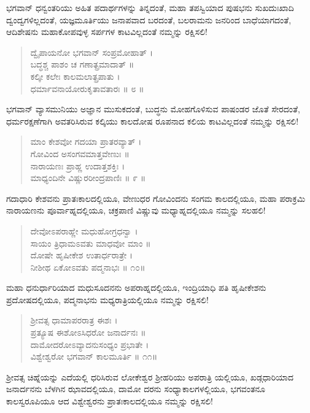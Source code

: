 ಭಗವಾನ್ ಧನ್ವಂತರಿಯು ಅಹಿತ ಪದಾರ್ಥಗಳನ್ನು ತಿನ್ನದಂತೆ, ಮಹಾ ತಪಸ್ವಿಯಾದ ಪುಷಭನು ಸುಖದುಃಖಾದಿ ದ್ವಂದ್ವಗಳಿಲ್ಲದಂತೆ, ಯಜ್ಞಮೂರ್ತಿಯು ಜನಾಪವಾದ ಬರದಂತೆ, ಬಲರಾಮನು ಜನರಿಂದ ಬಾಧೆಯಾಗದಂತೆ, ಆದಿಶೇಷನು ಮಹಾಕೋಪವುಳ್ಳ ಸರ್ಪಗಳ ಕಾಟವಿಲ್ಲದಂತೆ ನಮ್ಮನ್ನು ರಕ್ಷಿಸಲಿ!

\begin{verse}
ದ್ವೈಪಾಯನೋ ಭಗವಾನ್ ಸಂಪ್ರಮೋಹಾತ್ ।\\ಬದ್ಧಶ್ಚ ಪಾಶಂ ಚ ಗಣಾತ್ಪ್ರಮಾದಾತ್ ॥\\ಕಲ್ಕೀ ಕಲೇಃ ಕಾಲಮಲಾತ್ಪ್ರಪಾತು ।\\ಧರ್ಮಾವನಾಯೋರುಕೃತಾವತಾರಃ \num{॥ ೮ ॥}
\end{verse}

ಭಗವಾನ್ ವ್ಯಾಸಮುನಿಯು ಅಜ್ಞಾನ ಮುಸುಕದಂತೆ, ಬುದ್ಧನು ಮೋಹಗೊಳಿಸುವ ಪಾಷಂಡರ ಜೊತೆ ಸೇರದಂತೆ, ಧರ್ಮರಕ್ಷಣೆಗಾಗಿ ಅವತರಿಸಿರುವ ಕಲ್ಕಿಯು ಕಾಲದೋಷ ರೂಪನಾದ ಕಲಿಯ ಕಾಟವಿಲ್ಲದಂತೆ ನಮ್ಮನ್ನು ರಕ್ಷಿಸಲಿ!

\begin{verse}
ಮಾಂ ಕೇಶವೋ ಗದಯಾ ಪ್ರಾತರವ್ಯಾತ್ ।\\ಗೋವಿಂದ ಅಸಂಗವಮಾತ್ತವೇಣುಃ ॥\\ನಾರಾಯಣಃ ಪ್ರಾಹ್ಣ ಉದಾತ್ತಶಕ್ತಿಃ ।\\ಮಾಧ್ಯಂದಿನೇ ವಿಷ್ಣುರರೀಂದ್ರಪಾಣಿಃ \num{॥ ೯ ॥}
\end{verse}

ಗದಾಧಾರಿ ಕೇಶವನು ಪ್ರಾತಃಕಾಲದಲ್ಲಿಯೂ, ವೇಣುಧರ ಗೋವಿಂದನು ಸಂಗಮ ಕಾಲದಲ್ಲಿಯೂ, ಮಹಾ ಪರಾಕ್ರಮಿ ನಾರಾಯಣನು ಪೂರ್ವಾಹ್ನದಲ್ಲಿಯೂ, ಚಕ್ರಪಾಣಿ ವಿಷ್ಣುವು ಮಧ್ಯಾಹ್ನದಲ್ಲಿಯೂ ನಮ್ಮನ್ನು ಸಲಹಲಿ!

\begin{verse}
ದೇವೋಽಪರಾಹ್ಣೇ ಮಧುಹೋಗ್ರಧನ್ವಾ ।\\ಸಾಯಂ ತ್ರಿಧಾಮಽವತು ಮಾಧವೋ ಮಾಂ ॥\\ದೋಷೇ ಹೃಷೀಕೇಶ ಉತಾರ್ಧರಾತ್ರೇ ।\\ನೀಶೀಥ ಏಕೋಽವತು ಪದ್ಮನಾಭಃ \num{॥ ೧೦॥}
\end{verse}

ಮಹಾ ಧನುರ್ಧಾರಿಯಾದ ಮಧುಸೂದನನು ಅಪರಾಹ್ನದಲ್ಲಿಯೂ, ಇಂದ್ರಿಯಾಧಿ ಪತಿ ಹೃಷೀಕೇಶನು ಪ್ರದೋಷದಲ್ಲಿಯೂ, ಪದ್ಮನಾಭನು ಮಧ್ಯರಾತ್ರಿಯಲ್ಲಿಯೂ ನಮ್ಮನ್ನು ರಕ್ಷಿಸಲಿ!

\begin{verse}
ಶ್ರೀವತ್ಸ ಧಾಮಾಪರರಾತ್ರ ಈಶಃ ।\\ಪ್ರತ್ಯೂಷ ಈಶೋಽಸಿಧರೋ ಜನಾರ್ದನಃ ॥\\ದಾಮೋದರೋಽವ್ಯಾದನುಸಂಧ್ಯಂ ಪ್ರಭಾತೇ ।\\ವಿಶ್ವೇಶ್ವರೋ ಭಗವಾನ್ ಕಾಲಮೂರ್ತಿ \num{॥ ೧೧॥}
\end{verse}

ಶ್ರೀವತ್ಸ ಚಿಹ್ನೆಯನ್ನು ಎದೆಯಲ್ಲಿ ಧರಿಸಿರುವ ಲೋಕೇಶ್ವರ ಶ್ರೀಹರಿಯು ಅಪರಾತ್ರಿ ಯಲ್ಲಿಯೂ, ಖಡ್ಗಧಾರಿಯಾದ ಜನಾರ್ದನನು ಬೆಳಗಿನ ಝಾವದಲ್ಲಿಯೂ, ದಾಮೋ ದರನು ಸಂಧ್ಯಾಕಾಲಗಳಲ್ಲಿಯೂ, ಭಗವಂತನೂ ಕಾಲಸ್ವರೂಪಿಯೂ ಆದ ವಿಶ್ವೇಶ್ವರನು ಪ್ರಾತಃಕಾಲದಲ್ಲಿಯೂ ನಮ್ಮನ್ನು ರಕ್ಷಿಸಲಿ!

